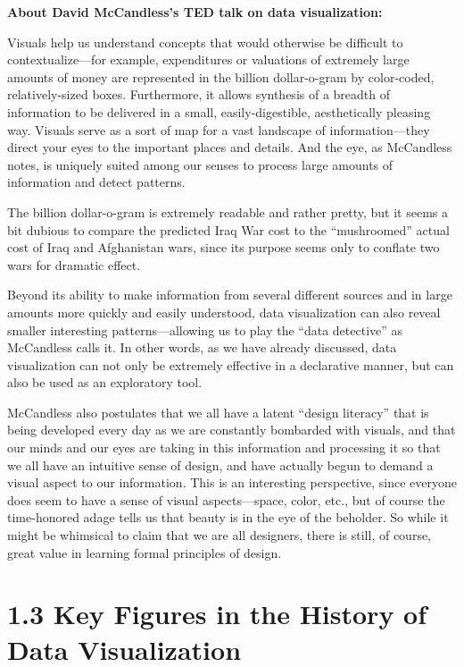 \documentclass[]{book}
\theoremstyle{definition}
\theoremstyle{definition}
\theoremstyle{definition}
\theoremstyle{remark}
\begin{document}
\citep{viz_importance}

\textbf{About David McCandless's TED talk on data visualization:}

Visuals help us understand concepts that would otherwise be difficult to
contextualize---for example, expenditures or valuations of extremely
large amounts of money are represented in the billion dollar-o-gram by
color-coded, relatively-sized boxes. Furthermore, it allows synthesis of
a breadth of information to be delivered in a small, easily-digestible,
aesthetically pleasing way. Visuals serve as a sort of map for a vast
landscape of information---they direct your eyes to the important places
and details. And the eye, as McCandless notes, is uniquely suited among
our senses to process large amounts of information and detect patterns.

The billion dollar-o-gram is extremely readable and rather pretty, but
it seems a bit dubious to compare the predicted Iraq War cost to the
``mushroomed'' actual cost of Iraq and Afghanistan wars, since its
purpose seems only to conflate two wars for dramatic effect.

Beyond its ability to make information from several different sources
and in large amounts more quickly and easily understood, data
visualization can also reveal smaller interesting patterns---allowing us
to play the ``data detective'' as McCandless calls it. In other words,
as we have already discussed, data visualization can not only be
extremely effective in a declarative manner, but can also be used as an
exploratory tool.

McCandless also postulates that we all have a latent ``design literacy''
that is being developed every day as we are constantly bombarded with
visuals, and that our minds and our eyes are taking in this information
and processing it so that we all have an intuitive sense of design, and
have actually begun to demand a visual aspect to our information. This
is an interesting perspective, since everyone does seem to have a sense
of visual aspects---space, color, etc., but of course the time-honored
adage tells us that beauty is in the eye of the beholder. So while it
might be whimsical to claim that we are all designers, there is still,
of course, great value in learning formal principles of design.

\citep{viz_ted}

\section{1.3 Key Figures in the History of Data
Visualization}\label{key-figures-in-the-history-of-data-visualization}
\end{document}
